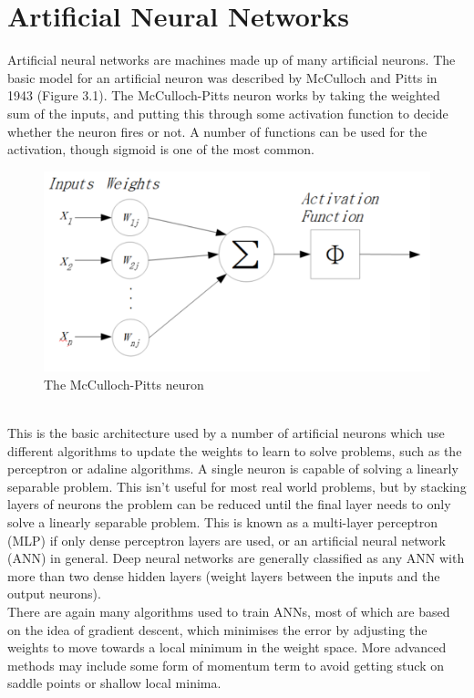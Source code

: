 \documentclass[12pt,a4paper,titlepage]{book}
\begin{document}
\section{Artificial Neural Networks}
	Artificial neural networks are machines made up of many artificial neurons. The basic model for an artificial neuron was described by McCulloch and Pitts in 1943\cite{mcculloch-pitts-neuron} (Figure 3.1). The McCulloch-Pitts neuron works by taking the weighted sum of the inputs, and putting this through some activation function to decide whether the neuron fires or not. A number of functions can be used for the activation, though sigmoid is one of the most common.
\begin{figure}[h!]
  \centering
  \includegraphics[width=0.7\linewidth]{mcculloch-pitts.png}
  \caption{The McCulloch-Pitts neuron}
  \label{fig:m-p-neuron}
\end{figure}\\
	This is the basic architecture used by a number of artificial neurons which use different algorithms to update the weights to learn to solve problems, such as the perceptron or adaline algorithms. A single neuron is capable of solving a linearly separable problem\cite{ml-algorithmic-perspective}. This isn't useful for most real world problems, but by stacking layers of neurons the problem can be reduced until the final layer needs to only solve a linearly separable problem. This is known as a multi-layer perceptron (MLP) if only dense perceptron layers are used, or an artificial neural network (ANN) in general\cite{intro-to-nn}. Deep neural networks are generally classified as any ANN with more than two dense hidden layers (weight layers between the inputs and the output neurons).\\
	There are again many algorithms used to train ANNs, most of which are based on the idea of gradient descent, which minimises the error by adjusting the weights to move towards a local minimum in the weight space\cite{back-prop}. More advanced methods may include some form of momentum term to avoid getting stuck on saddle points or shallow local minima.
\end{document}
